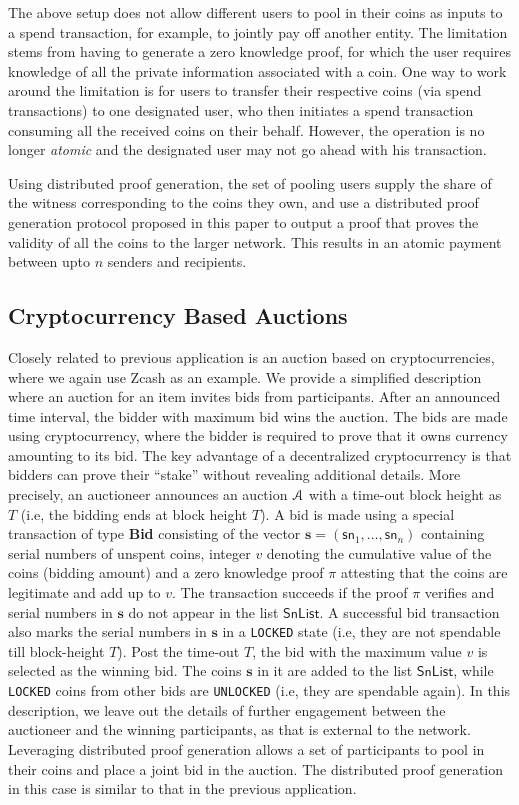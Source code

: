  The above setup does not allow different users to pool in their coins as inputs to a spend transaction, for example,
to jointly pay off another entity. The limitation stems from having to generate a zero knowledge proof, for which the user requires knowledge of all the
private information associated with a coin. One way to work around the limitation is for users to transfer their respective coins (via spend transactions) 
to one designated user, who then initiates a spend transaction consuming all the received coins on their behalf. 
However, the operation is no longer {\em atomic} and the designated user may not go ahead with his transaction. 

Using distributed proof generation, the set of pooling users supply the share of the witness corresponding to the coins they own,
and use a distributed proof generation protocol proposed in this paper to output a proof that proves the validity of all the coins to the 
larger network. This results in an atomic payment between upto $n$ senders and recipients.

\subsection{Cryptocurrency Based Auctions}\label{sec:application2}
Closely related to previous application is an auction based on cryptocurrencies, where we again use Zcash as an example. 
We provide a simplified description where an auction for an item invites bids from participants. After an announced time interval, the bidder with maximum bid wins the auction. The bids are
made using cryptocurrency, where the bidder is required to prove that it owns currency amounting to its bid. The key advantage of a decentralized
cryptocurrency is that bidders can prove their ``stake'' without revealing additional details. More precisely, an auctioneer announces an auction
$\mathcal{A}$ with a time-out block height as $T$ (i.e, the bidding ends at block height $T$). A bid is made using a special transaction of type {\bf Bid}
consisting of the vector $\bm{s}=(\mathsf{sn}_1,\ldots,\mathsf{sn}_n)$ containing serial numbers of unspent coins, integer $v$ denoting the cumulative
value of the coins (bidding amount) and a zero knowledge proof $\pi$ attesting that the coins are legitimate and add up to $v$. The transaction succeeds
if the proof $\pi$ verifies and serial numbers in $\bm{s}$ do not appear in the list $\mathsf{SnList}$. A successful bid transaction also marks
the serial numbers in $\bm{s}$ in a {\tt LOCKED} state (i.e, they are not spendable till block-height $T$). Post the time-out $T$, 
the bid with the maximum value $v$ is selected as the winning bid. The 
coins $\bm{s}$ in it are added to the list $\mathsf{SnList}$, while {\tt LOCKED} coins from other bids are {\tt UNLOCKED} (i.e, they are spendable again).
In this description, we leave out the details of further engagement between the auctioneer and the winning participants, as that is external to the network.
Leveraging distributed proof generation allows a set of participants to pool in their coins and place a joint bid in the auction. The distributed proof
generation in this case is similar to that in the previous application.



